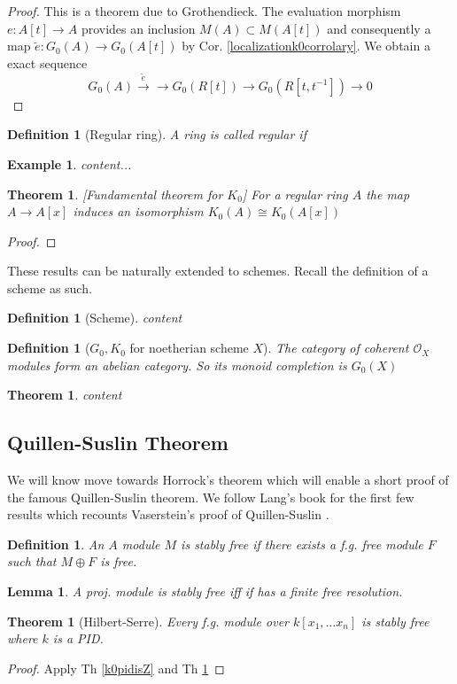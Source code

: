 \documentclass[12pt]{article}
\numberwithin{equation}{section}
\newcounter{dummy} \numberwithin{dummy}{section}
\newtheorem{theorem}[dummy]{Theorem}
\newtheorem{definition}[dummy]{Definition}
\newtheorem{lemma}[dummy]{Lemma}
\newtheorem{example}[dummy]{Example}
\begin{document}
	\begin{proof}
		This is a theorem due to Grothendieck.
		The evaluation morphism $e: A[t] \to A$ provides an inclusion $M(A) \subset M(A[t])$ and consequently a map $\tilde{e}: G_0(A) \to G_0(A[t])$ by Cor. \ref{localizationk0corrolary}. We obtain a exact sequence \[ G_0(A) \xrightarrow{\tilde{e}} \to G_0(R[t]) \to G_0(R[t,t^{-1}]) \to 0 \]
	\end{proof}
	
	
	\begin{definition}[Regular ring] A ring is called regular if
	\end{definition}
	\begin{example}
		content...
	\end{example}
	\begin{theorem}\label{extensionk0iscong}[Fundamental theorem for $K_0$]
		For a regular ring $A$ the map $A \to A[x]$ induces an isomorphism $K_0(A) \cong K_0(A[x])$ 
	\end{theorem}
	\begin{proof}
	
	\end{proof}
	
	These results can be naturally extended to schemes. Recall the definition of a scheme as such.
	\begin{definition}[Scheme]
		content
	\end{definition}
	\begin{definition}[$G_0, K_0$ for noetherian scheme $X$]
		The category of coherent $\mathcal{O}_X$ modules form an abelian category. So its monoid completion is $G_0(X)$
	\end{definition}
	\begin{theorem}
		content
	\end{theorem}
%	
%		
	
	
	
	\subsection{Quillen-Suslin Theorem}
	We will know move towards Horrock's theorem which will enable a short proof of the famous Quillen-Suslin theorem. We follow Lang's book for the first few results which recounts Vaserstein's proof of Quillen-Suslin \cite{lang02}.
	
	\begin{definition}
	An $A$ module $M$ is stably free if there exists a f.g. free module $F$ such that $M \oplus F$ is free.
	\end{definition}
	\begin{lemma}
	A proj. module is stably free iff if has a finite free resolution.
	\end{lemma}
	\begin{theorem}[Hilbert-Serre]
	Every f.g. module over $k[x_1,\dots x_n]$ is stably free where $k$ is a PID.
	\end{theorem}
	\begin{proof}
		Apply Th \ref{k0pidisZ} and Th \ref{extensionk0iscong}
	\end{proof}
	
\end{document}
